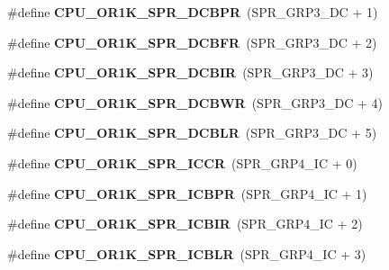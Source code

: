 \begin{DoxyCompactItemize}
\item 
\mbox{\label{or1k-utility_8h_aca41b1b6a8735336d56458e799a07da6}} 
\#define {\bfseries C\+P\+U\+\_\+\+O\+R1\+K\+\_\+\+S\+P\+R\+\_\+\+D\+C\+B\+PR}~(S\+P\+R\+\_\+\+G\+R\+P3\+\_\+\+DC + 1)
\item 
\mbox{\label{or1k-utility_8h_aed130733d7a170e265101e5c46c6609f}} 
\#define {\bfseries C\+P\+U\+\_\+\+O\+R1\+K\+\_\+\+S\+P\+R\+\_\+\+D\+C\+B\+FR}~(S\+P\+R\+\_\+\+G\+R\+P3\+\_\+\+DC + 2)
\item 
\mbox{\label{or1k-utility_8h_a40f37c37a3877307765eb1a69877e432}} 
\#define {\bfseries C\+P\+U\+\_\+\+O\+R1\+K\+\_\+\+S\+P\+R\+\_\+\+D\+C\+B\+IR}~(S\+P\+R\+\_\+\+G\+R\+P3\+\_\+\+DC + 3)
\item 
\mbox{\label{or1k-utility_8h_aa34b14fc697872af4177ab4b78b708e6}} 
\#define {\bfseries C\+P\+U\+\_\+\+O\+R1\+K\+\_\+\+S\+P\+R\+\_\+\+D\+C\+B\+WR}~(S\+P\+R\+\_\+\+G\+R\+P3\+\_\+\+DC + 4)
\item 
\mbox{\label{or1k-utility_8h_ae5b258b303e900bd09fcd2c076066117}} 
\#define {\bfseries C\+P\+U\+\_\+\+O\+R1\+K\+\_\+\+S\+P\+R\+\_\+\+D\+C\+B\+LR}~(S\+P\+R\+\_\+\+G\+R\+P3\+\_\+\+DC + 5)
\item 
\mbox{\label{or1k-utility_8h_a56fdb22c05b176ca17127a88d67abd31}} 
\#define {\bfseries C\+P\+U\+\_\+\+O\+R1\+K\+\_\+\+S\+P\+R\+\_\+\+I\+C\+CR}~(S\+P\+R\+\_\+\+G\+R\+P4\+\_\+\+IC + 0)
\item 
\mbox{\label{or1k-utility_8h_a48e63e4a0f6375f24559571a60f969d8}} 
\#define {\bfseries C\+P\+U\+\_\+\+O\+R1\+K\+\_\+\+S\+P\+R\+\_\+\+I\+C\+B\+PR}~(S\+P\+R\+\_\+\+G\+R\+P4\+\_\+\+IC + 1)
\item 
\mbox{\label{or1k-utility_8h_aa69b891d2d7d47d77ea31ab23c66c6e2}} 
\#define {\bfseries C\+P\+U\+\_\+\+O\+R1\+K\+\_\+\+S\+P\+R\+\_\+\+I\+C\+B\+IR}~(S\+P\+R\+\_\+\+G\+R\+P4\+\_\+\+IC + 2)
\item 
\mbox{\label{or1k-utility_8h_a777f602280ffaf00189467183e0b6ca2}} 
\#define {\bfseries C\+P\+U\+\_\+\+O\+R1\+K\+\_\+\+S\+P\+R\+\_\+\+I\+C\+B\+LR}~(S\+P\+R\+\_\+\+G\+R\+P4\+\_\+\+IC + 3)

\end{DoxyCompactItemize}
